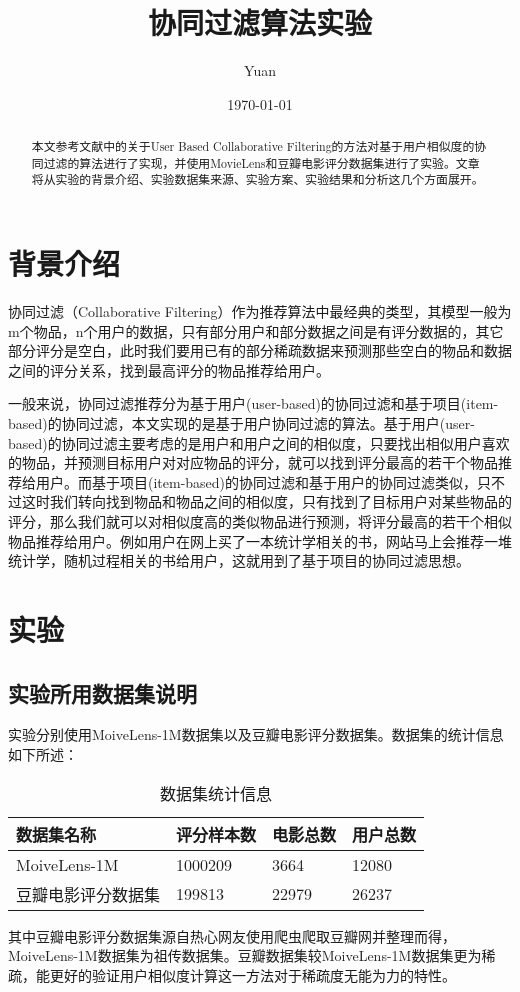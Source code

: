 \documentclass[12pt,a4paper]{ctexart}
\title{协同过滤算法实验}
\author{Yuan}
\date{\small\today}
\begin{document}
\maketitle
\begin{abstract}
本文参考文献\Autocite{Herlocker:1999:AFP:312624.312682}中的关于User Based Collaborative Filtering的方法对基于用户相似度的协同过滤的算法进行了实现，并使用MovieLens\Autocite{moivelens1m_dataset}和豆瓣电影评分数据集\Autocite{douban_dataset}进行了实验。文章将从实验的背景介绍、实验数据集来源、实验方案、实验结果和分析这几个方面展开。
\end{abstract}	
\section{背景介绍}
协同过滤（Collaborative Filtering）作为推荐算法中最经典的类型，其模型一般为m个物品，n个用户的数据，只有部分用户和部分数据之间是有评分数据的，其它部分评分是空白，此时我们要用已有的部分稀疏数据来预测那些空白的物品和数据之间的评分关系，找到最高评分的物品推荐给用户。

一般来说，协同过滤推荐分为基于用户(user-based)的协同过滤和基于项目(item-based)的协同过滤，本文实现的是基于用户协同过滤的算法。基于用户(user-based)的协同过滤主要考虑的是用户和用户之间的相似度，只要找出相似用户喜欢的物品，并预测目标用户对对应物品的评分，就可以找到评分最高的若干个物品推荐给用户\Autocite{推荐系统实践}。而基于项目(item-based)的协同过滤和基于用户的协同过滤类似，只不过这时我们转向找到物品和物品之间的相似度，只有找到了目标用户对某些物品的评分，那么我们就可以对相似度高的类似物品进行预测，将评分最高的若干个相似物品推荐给用户。例如用户在网上买了一本统计学相关的书，网站马上会推荐一堆统计学，随机过程相关的书给用户，这就用到了基于项目的协同过滤思想。

\section{实验}
\subsection{实验所用数据集说明}
实验分别使用MoiveLens-1M数据集以及豆瓣电影评分数据集。数据集的统计信息如下所述：
\begin{table}[H]
	\centering
	\begin{tabular}{@{}llll@{}}
		\toprule
		数据集名称        & 评分样本数   & 电影总数  & 用户总数  \\ \midrule
		MoiveLens-1M & 1000209 & 3664  & 12080 \\
		豆瓣电影评分数据集    & 199813  & 22979 & 26237 \\ \bottomrule
	\end{tabular}
	\caption{数据集统计信息}
\label{table:dataset}
\end{table}
其中豆瓣电影评分数据集源自热心网友使用爬虫爬取豆瓣网并整理而得，MoiveLens-1M数据集为祖传数据集。豆瓣数据集较MoiveLens-1M数据集更为稀疏，能更好的验证用户相似度计算这一方法对于稀疏度无能为力的特性。
\end{document}

